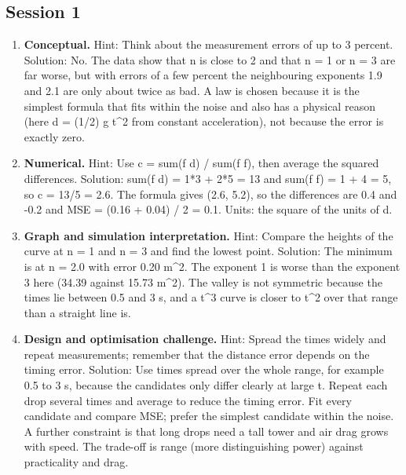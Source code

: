 \documentclass[11pt,a4paper]{article}
\begin{document}
\subsection*{Session 1}
\begin{enumerate}[nosep]
\item \textbf{Conceptual.} Hint: Think about the measurement errors of up to 3 percent. Solution: No. The data show that n is close to 2 and that n = 1 or n = 3 are far worse, but with errors of a few percent the neighbouring exponents 1.9 and 2.1 are only about twice as bad. A law is chosen because it is the simplest formula that fits within the noise and also has a physical reason (here d = (1/2) g t\textasciicircum{}2 from constant acceleration), not because the error is exactly zero.
\item \textbf{Numerical.} Hint: Use c = sum(f d) / sum(f f), then average the squared differences. Solution: sum(f d) = 1*3 + 2*5 = 13 and sum(f f) = 1 + 4 = 5, so c = 13/5 = 2.6. The formula gives (2.6, 5.2), so the differences are 0.4 and -0.2 and MSE = (0.16 + 0.04) / 2 = 0.1. Units: the square of the units of d.
\item \textbf{Graph and simulation interpretation.} Hint: Compare the heights of the curve at n = 1 and n = 3 and find the lowest point. Solution: The minimum is at n = 2.0 with error 0.20 m\textasciicircum{}2. The exponent 1 is worse than the exponent 3 here (34.39 against 15.73 m\textasciicircum{}2). The valley is not symmetric because the times lie between 0.5 and 3 s, and a t\textasciicircum{}3 curve is closer to t\textasciicircum{}2 over that range than a straight line is.
\item \textbf{Design and optimisation challenge.} Hint: Spread the times widely and repeat measurements; remember that the distance error depends on the timing error. Solution: Use times spread over the whole range, for example 0.5 to 3 s, because the candidates only differ clearly at large t. Repeat each drop several times and average to reduce the timing error. Fit every candidate and compare MSE; prefer the simplest candidate within the noise. A further constraint is that long drops need a tall tower and air drag grows with speed. The trade-off is range (more distinguishing power) against practicality and drag.
\end{enumerate}
\end{document}
